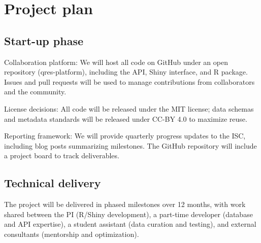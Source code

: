 \documentclass[
  letterpaper,
  DIV=11,
  numbers=noendperiod]{scrartcl}
\begin{document}
\section{Project plan}\label{project-plan}

\subsection{Start-up phase}\label{start-up-phase}

Collaboration platform: We will host all code on GitHub under an open
repository (qres-platform), including the API, Shiny interface, and R
package. Issues and pull requests will be used to manage contributions
from collaborators and the community.

License decisions: All code will be released under the MIT license; data
schemas and metadata standards will be released under CC-BY 4.0 to
maximize reuse.

Reporting framework: We will provide quarterly progress updates to the
ISC, including blog posts summarizing milestones. The GitHub repository
will include a project board to track deliverables.

\subsection{Technical delivery}\label{technical-delivery}

The project will be delivered in phased milestones over 12 months, with
work shared between the PI (R/Shiny development), a part-time developer
(database and API expertise), a student assistant (data curation and
testing), and external consultants (mentorship and optimization).
\end{document}

